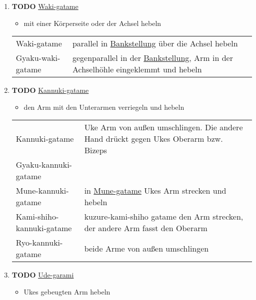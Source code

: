 \documentclass[11pt]{article}
\begin{document}
\begin{enumerate}
\begin{enumerate}
\item {\bfseries\sffamily TODO} \hyperref[org78b6927]{Waki-gatame}
\label{sec:org16b1cce}

\begin{itemize}
\item mit einer Körperseite oder der Achsel hebeln
\end{itemize}

\begin{center}
\begin{tabular}{ll}
\label{org78b6927}Waki-gatame & parallel in \hyperref[orgbc37293]{Bankstellung} über die Achsel hebeln\\
\label{orgbe01075}Gyaku-waki-gatame & gegenparallel in der \hyperref[orgbc37293]{Bankstellung}, Arm in der Achselhöhle eingeklemmt und hebeln\\
\end{tabular}
\end{center}

\item {\bfseries\sffamily TODO} \hyperref[org84d30c4]{Kannuki-gatame}
\label{sec:orgdeafc6a}

\begin{itemize}
\item den Arm mit den Unterarmen verriegeln und hebeln
\end{itemize}

\begin{center}
\begin{tabular}{ll}
\label{org84d30c4}Kannuki-gatame & Uke Arm von außen umschlingen. Die andere Hand drückt gegen Ukes Oberarm bzw. Bizeps\\
\label{orga60e3ab}Gyaku-kannuki-gatame & \\
\label{org908bda4}Mune-kannuki-gatame & in \hyperref[orgaf7dc4e]{Mune-gatame} Ukes Arm strecken und hebeln\\
\label{org73eaae9}Kami-shiho-kannuki-gatame & kuzure-kami-shiho gatame den Arm strecken, der andere Arm fasst den Oberarm\\
\label{org01ecf47}Ryo-kannuki-gatame & beide Arme von außen umschlingen\\
\end{tabular}
\end{center}

\item {\bfseries\sffamily TODO} \hyperref[org3627c27]{Ude-garami}
\label{sec:org0239140}

\begin{itemize}
\item Ukes gebeugten Arm hebeln
\end{itemize}


\end{enumerate}
\end{enumerate}
\end{document}
